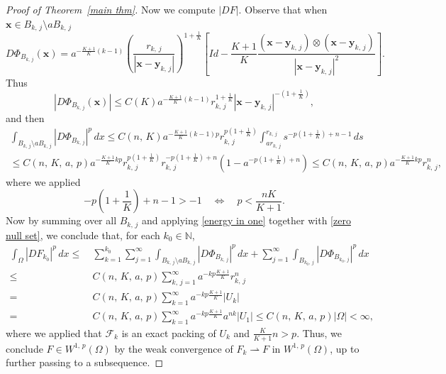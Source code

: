 \documentclass[10pt,a4paper]{amsart}
\begin{document}
\begin{proof}[Proof of Theorem~\ref{main thm}]
 Now we compute $|DF|$. Observe that when $\mathbf x\in B_{k,\,j}\setminus a B_{k,\,j}$
$$D\Phi_{B_{k,\,j}}(\mathbf x) =a^{-\frac {K+1} K(k-1)}\left(\frac{r_{k,\,j}}{|\mathbf {x}-\mathbf {y}_{k,\,j}|}\right)^{1+\frac 1 K} \left[Id-\frac{K+1}{K} \frac{(\mathbf {x}-\mathbf {y}_{k,\,j})\otimes (\mathbf {x}-\mathbf {y}_{k,\,j})}{|\mathbf {x}-\mathbf {y}_{k,\,j}|^2}\right].$$
Thus
$$|D\Phi_{B_{k,\,j}}(\mathbf x)|\le C(K)a^{-\frac {K+1} K(k-1)} r_{k,\,j}^{1+\frac 1 K}|\mathbf {x}-\mathbf {y}_{k,\,j}|^{-\left(1+\frac 1 K\right)},$$
and then
\begin{multline}\label{energy in one}
\int_{B_{k,\,j}\setminus a B_{k,\,j}} |D\Phi_{B_{k,\,j}}|^p\,dx\le  C(n,\,K) a^{-\frac {K+1} K(k-1)p} r_{k,\,j}^{p\left(1+\frac 1 K\right)}\int_{ar_{k,\,j}}^{r_{k,\,j}} s^{-p\left(1+\frac 1 K\right)+n-1}\, ds \\
\le C(n,\,K,\,a,\,p) a^{-\frac {K+1} K kp} r_{k,\,j}^{p\left(1+\frac 1 K\right)} r_{k,\,j}^{-p\left(1+\frac 1 K\right)+n}(1-a^{-p\left(1+\frac 1 K\right)+n})\le C(n,\,K,\,a,\,p) a^{-\frac {K+1} K kp}r_{k,\,j}^n,
\end{multline}
where we applied
$$-p\left(1+\frac 1 K\right)+n-1> -1 \quad \Longleftrightarrow \quad p<\frac{nK}{K+1}.$$
Now by summing over all $B_{k,\,j}$ and applying \eqref{energy in one} together with \eqref{zero null set}, we conclude that, for each $k_0\in \mathbb N$,
\begin{align*}
\int_{\Omega} |DF_{k_0}|^p\,dx\le & \ \sum_{k=1}^{k_0}\sum_{j=1}^\infty\int_{B_{k,\,j}\setminus a B_{k,\,j}} |D\Phi_{B_{k,\,j}}|^p\,dx + \sum_{j=1}^{\infty}\int_{B_{k_0,\,j}} |D\Phi_{B_{k_0,\,j}}|^p\,dx \\
\le  & \ C(n,\,K,\,a,\,p)\sum_{k,\,j=1}^\infty a^{-kp\frac{K+1} K }r_{k,\,j}^n  \\ 
= & \ C(n,\,K,\,a,\,p)\sum_{k=1}^\infty a^{-kp\frac{K+1} K }|U_{k}|\\
=&\ C(n,\,K,\,a,\,p)\sum_{k=1}^\infty a^{-kp\frac{K+1} K } a^{nk}|U_1|
\le C(n,\,K,\,a,\,p) |\Omega|<\infty, 
\end{align*}
where we applied that $\mathcal F_k$ is an exact packing of $U_k$ and $\frac{K}{K+1}n>p$.
Thus, we conclude $F\in W^{1,\,p}(\Omega)$ by the weak convergence of $F_k\rightharpoonup F$ in $W^{1,\,p}(\Omega)$, up to further passing to a subsequence. 
\end{proof}
\end{document}
